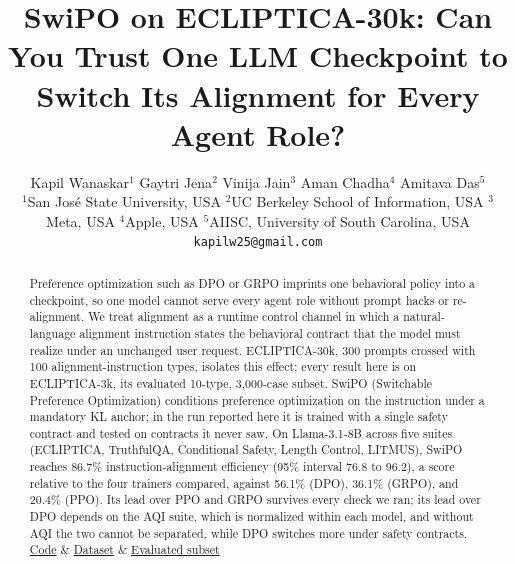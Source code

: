 \documentclass[11pt]{article}
\title{SwiPO on ECLIPTICA-30k: Can You Trust One LLM Checkpoint to Switch Its Alignment for Every Agent Role?}
\author{
Kapil Wanaskar$^{1}$ \quad Gaytri Jena$^{2}$ \quad Vinija Jain$^{3}$ \quad Aman Chadha$^{4}$ \quad Amitava Das$^{5}$ \\[0.5em]
{\small $^{1}$San Jos\'e State University, USA \quad $^{2}$UC Berkeley School of Information, USA \quad $^{3}$Meta, USA \quad $^{4}$Apple, USA \quad $^{5}$AIISC, University of South Carolina, USA} \\[0.3em]
{\small \texttt{kapilw25@gmail.com}}
}
\begin{document}
\maketitle

\begin{abstract}
\vspace{-1.5mm}
Preference optimization such as DPO or GRPO imprints one behavioral policy into a checkpoint, so one model cannot serve every agent role without prompt hacks or re-alignment. We treat alignment as a runtime control channel in which a natural-language alignment instruction states the behavioral contract that the model must realize under an unchanged user request. ECLIPTICA-30k, 300 prompts crossed with 100 alignment-instruction types, isolates this effect; every result here is on ECLIPTICA-3k, its evaluated 10-type, 3{,}000-case subset. SwiPO (Switchable Preference Optimization) conditions preference optimization on the instruction under a mandatory KL anchor; in the run reported here it is trained with a single safety contract and tested on contracts it never saw. On Llama-3.1-8B across five suites (ECLIPTICA, TruthfulQA, Conditional Safety, Length Control, LITMUS), SwiPO reaches 86.7\% instruction-alignment efficiency (95\% interval 76.8 to 96.2), a score relative to the four trainers compared, against 56.1\% (DPO), 36.1\% (GRPO), and 20.4\% (PPO). Its lead over PPO and GRPO survives every check we ran; its lead over DPO depends on the AQI suite, which is normalized within each model, and without AQI the two cannot be separated, while DPO switches more under safety contracts. \href{https://github.com/kapilw25/cita_ecliptica}{Code} \& \href{https://huggingface.co/datasets/anonymousML123/ECLIPTICA-30k}{Dataset} \& \href{https://huggingface.co/datasets/anonymousML123/ECLIPTICA-3k}{Evaluated subset}

\end{abstract}
\end{document}
